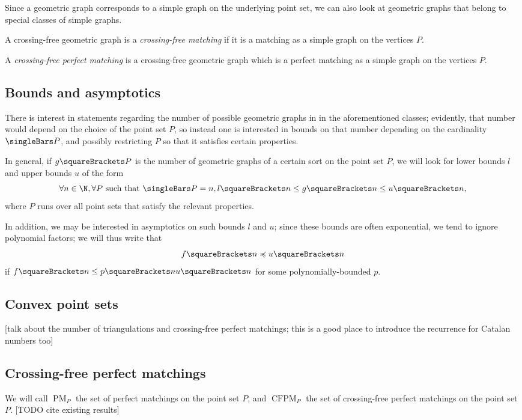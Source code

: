 \documentclass[10pt, a4paper, twoside]{basestyle}
\DeclareMathOperator{\PM}{PM}
\DeclareMathOperator{\CFPM}{CFPM}
\begin{document}
Since a geometric graph corresponds to a simple graph on the underlying point set,
we can also look at geometric graphs that belong to special classes of simple graphs.
\begin{definition}
A crossing-free geometric graph is a \emph{crossing-free matching} if it is a matching
as a simple graph on the vertices $P$.
\end{definition}
\begin{definition}
A \emph{crossing-free perfect matching} is a crossing-free geometric graph which is
a perfect matching as a simple graph on the vertices $P$.
\end{definition}
\subsection{Bounds and asymptotics}
There is interest in statements regarding the number of possible geometric graphs in
in the aforementioned classes; evidently, that number would depend on the choice of
the point set $P$, so instead one is interested in bounds on that number depending
on the cardinality $\Cardinality P$, and possibly restricting $P$ so that it satisfies
certain properties.

In general, if $g\of P$ is the number of geometric graphs of a certain sort on the point
set $P$, we will look for lower bounds $l$ and upper bounds $u$ of the form\[
\forall n\in \N, \forall P \text{ such that } \Cardinality P = n,
l \of n \leq g \of n \leq u \of n \text,\]
where $P$ runs over all point sets that satisfy the relevant properties.

In addition, we may be interested in asymptotics on such bounds $l$ and $u$; since these bounds are
often exponential, we tend to ignore polynomial factors; we will thus write that\[
f \of n \preccurlyeq u \of n
\]
if $f\of n \leq p\of n u \of n$ for some polynomially-bounded $p$.
\subsection{Convex point sets}
[talk about the number of triangulations and crossing-free perfect matchings; this is a good place
to introduce the recurrence for Catalan numbers too]

\subsection{Crossing-free perfect matchings}
We will call $\PM_P$ the set of perfect matchings on the point set $P$, and $\CFPM_P$ the set
of crossing-free perfect matchings on the point set $P$.
[TODO cite existing results]
\end{document}
